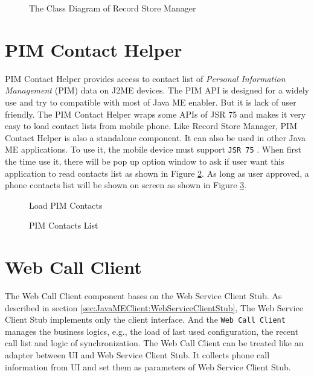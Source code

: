 \begin{figure}[!hbtp]
\centering
{}
\caption{The Class Diagram of Record Store Manager}
\label{fig:TheClassDiagramofRecordStoreManager}
\end{figure}

\section{PIM Contact Helper}
\label{sec:JavaMEClient:PIMContactHelper}

\textsf{PIM Contact Helper} provides access to contact list of \textit{Personal Information Management} (PIM) data on J2ME devices. The PIM API is designed for a widely use and try to compatible with most of Java ME enabler. But it is lack of user friendly. The PIM Contact Helper wraps some APIs of JSR 75 and makes it very easy to load contact lists from mobile phone. Like \textsf{Record Store Manager}, \textsf{PIM Contact Helper} is also a standalone component. It can also be used in other Java ME applications. To use it, the mobile device must support \texttt{JSR 75} \cite{JSR75}. When first the time use it, there will be pop up option window to ask if user want this application to read contacts list as shown in Figure \ref{fig:LoadPIMContacts}. As long as user approved, a phone contacts list will be shown on screen as shown in Figure \ref{fig:PIMContactsList}.  


\begin{figure}[!hbtp]
\centering
{}
\caption{Load PIM Contacts}
\label{fig:LoadPIMContacts}
\end{figure}


\begin{figure}[!hbtp]
\centering
{}
\caption{PIM Contacts List}
\label{fig:PIMContactsList}
\end{figure}

\section{Web Call Client}
\label{sec:JavaMEClient:WebCallClient}

The \textsf{Web Call Client} component bases on the \textsf{Web Service Client Stub}. As described in section \ref{sec:JavaMEClient:WebServiceClientStub}, The \textsf{Web Service Client Stub} implements only the client interface. And the \texttt{Web Call Client} manages the business logics, e.g., the load of last used configuration, the recent call list and logic of synchronization. The Web Call Client can be treated like an adapter between UI and Web Service Client Stub. It collects phone call information from UI and set them as parameters of Web Service Client Stub.

